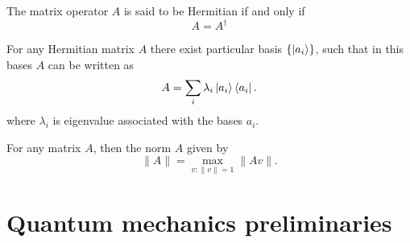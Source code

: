 \begin{defn}

The matrix operator $A$ is said  to be Hermitian  if and only if $$A=A^\dagger$$
\end{defn}

\begin{prop}\label{DIA}\citep*{book:1292540}
For any Hermitian matrix $A$ there exist particular  basis $\{\ket{a_i}\}$, such that in this bases  $A$ can be written as
\begin{equation}
A=\sum_i \lambda_i \ket{a_i}\bra{a_i}.
\end{equation}
where $\lambda_i$ is eigenvalue associated with the bases $a_i$.
\end{prop}
\begin{defn}
For any matrix $A$, then the norm  $A$ given by
\begin{equation}
\| A \|=\max_{v: \| v\|=1}\| A v\|\label{fact}.
\end{equation}
\end{defn}
\section{ Quantum mechanics preliminaries }
